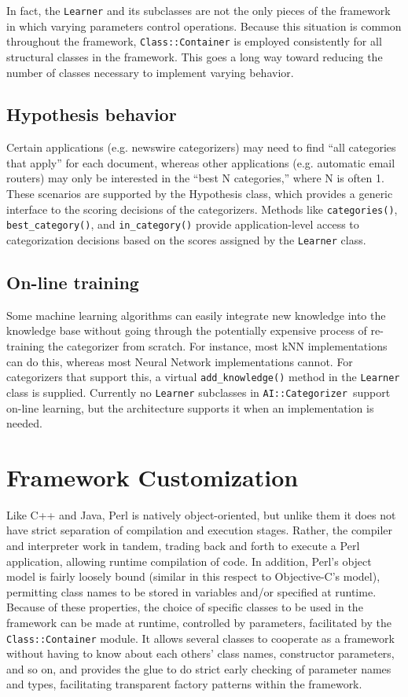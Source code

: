 \documentclass[twocolumn]{article}
\newcommand{\method}[1]{\texttt{#1()}}
\newcommand{\class}[1]{\texttt{#1}}
\newcommand{\aicat}{\texttt{AI::Cat\-e\-gor\-i\-zer}}
\begin{document}
In fact, the \class{Learner} and its subclasses are not the only
pieces of the framework in which varying parameters control
operations.  Because this situation is common throughout the
framework, \class{Class::Container} is employed consistently for all
structural classes in the framework.  This goes a long way toward
reducing the number of classes necessary to implement varying
behavior.

\subsection*{Hypothesis behavior}
Certain applications (e.g. newswire categorizers) may need to find
``all categories that apply'' for each document, whereas other
applications (e.g. automatic email routers) may only be interested in
the ``best N categories,'' where N is often 1.  These scenarios are
supported by the Hypothesis class, which provides a generic interface
to the scoring decisions of the categorizers.  Methods like
\method{categories}, \method{best\_category}, and
\method{in\_category} provide application-level access to
categorization decisions based on the scores assigned by the
\class{Learner} class.

\subsection*{On-line training}
Some machine learning algorithms can easily integrate new knowledge
into the knowledge base without going through the potentially
expensive process of re-training the categorizer from scratch.  For
instance, most kNN implementations can do this, whereas most Neural
Network implementations cannot.  For categorizers that support this, a
virtual \method{add\_knowledge} method in the \class{Learner} class
is supplied.  Currently no \class{Learner} subclasses in
\aicat\ support on-line learning, but the
architecture supports it when an implementation is needed.


\section{Framework Customization}

Like C++ and Java, Perl is natively object-oriented, but unlike them
it does not have strict separation of compilation and execution
stages.  Rather, the compiler and interpreter work in tandem, trading
back and forth to execute a Perl application, allowing runtime
compilation of code.  In addition, Perl's object model is fairly
loosely bound (similar in this respect to Objective-C's model),
permitting class names to be stored in variables and/or specified at
runtime.  Because of these properties, the choice of specific classes
to be used in the framework can be made at runtime, controlled by
parameters, facilitated by the \class{Class::Container} module.  It
allows several classes to cooperate as a framework without having to
know about each others' class names, constructor parameters, and so
on, and provides the glue to do strict early checking of parameter
names and types, facilitating transparent factory patterns within the
framework.
\end{document}
